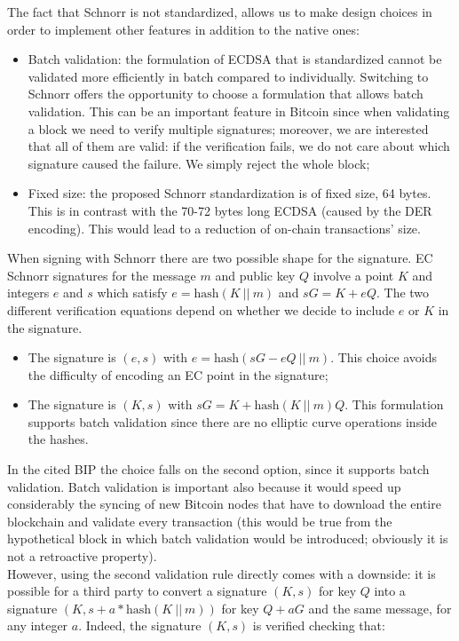\bigskip
\noindent
The fact that Schnorr is not standardized, allows us to make design choices in order to implement other features in addition to the native ones:
\begin{itemize}
	\item Batch validation: the formulation of ECDSA that is standardized cannot be validated more efficiently in batch compared to individually. Switching to Schnorr offers the opportunity to choose a formulation that allows batch validation. This can be an important feature in Bitcoin since when validating a block we need to verify multiple signatures; moreover, we are interested that all of them are valid: if the verification fails, we do not care about which signature caused the failure. We simply reject the whole block;
	\item Fixed size: the proposed Schnorr standardization is of fixed size, 64 bytes. This is in contrast with the 70-72 bytes long ECDSA (caused by the DER encoding). This would lead to a reduction of on-chain transactions' size.
\end{itemize}
When signing with Schnorr there are two possible shape for the signature. EC Schnorr signatures for the message $m$ and public key $Q$ involve a point $K$ and integers $e$ and $s$ which satisfy $e = \text{hash}(K \ || \ m)$ and $sG = K + eQ$. The two different verification equations depend on whether we decide to include $e$ or $K$ in the signature.
\begin{itemize}
	\item The signature is $(e, s)$ with $e = \text{hash}(sG - eQ \ || \ m)$. This choice avoids the difficulty of encoding an EC point in the signature;
	\item The signature is $(K, s)$ with $sG = K + \text{hash}(K \ || \ m)Q$. This formulation supports batch validation since there are no elliptic curve operations inside the hashes.
\end{itemize}
In the cited BIP the choice falls on the second option, since it supports batch validation. Batch validation is important also because it would speed up considerably the syncing of new Bitcoin nodes that have to download the entire blockchain and validate every transaction (this would be true from the hypothetical block in which batch validation would be introduced; obviously it is not a retroactive property).
\\
However, using the second validation rule directly comes with a downside: it is possible for a third party to convert a signature $(K, s)$ for key $Q$ into a signature $(K, s + a*\text{hash}(K \ || \ m))$ for key $Q + aG$ and the same message, for any integer $a$. Indeed, the signature $(K, s)$ is verified checking that: 
